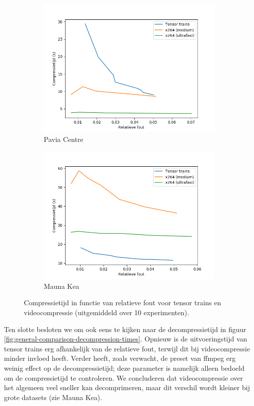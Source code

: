 \begin{figure}[H]
\begin{subfigure}{0.48\textwidth}
  \includegraphics[width=\linewidth]{images/general_comparison_times_Pavia_Centre.png}
  \caption{Pavia Centre}
\end{subfigure}
\begin{subfigure}{0.48\textwidth}
  \centering
  \includegraphics[width=\linewidth]{images/general_comparison_times_Mauna_Kea.png}
  \caption{Mauna Kea}
\end{subfigure}
\caption{Compressietijd in functie van relatieve fout voor tensor trains en videocompressie (uitgemiddeld over 10 experimenten).}
\label{fig:general-comparison-times}
\end{figure}

Ten slotte besloten we om ook eens te kijken naar de decompressietijd in figuur \ref{fig:general-comparison-decompression-times}. Opnieuw is de uitvoeringstijd van tensor trains erg afhankelijk van de relatieve fout, terwijl dit bij videocompressie minder invloed heeft. Verder heeft, zoals verwacht, de preset van ffmpeg erg weinig effect op de decompressietijd; deze parameter is namelijk alleen bedoeld om de compressietijd te controleren. We concluderen dat videocompressie over het algemeen veel sneller kan decomprimeren, maar dit verschil wordt kleiner bij grote datasets (zie Mauna Kea).

